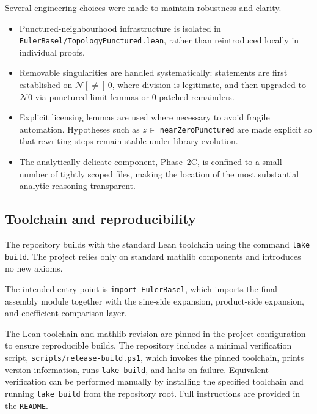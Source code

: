 \documentclass[11pt,a4paper]{article}
\theoremstyle{plain}
\theoremstyle{definition}
\DeclareRobustCommand{\codepath}[1]{\nolinkurl{#1}}
\newcommand{\nhds}{\ensuremath{\mathcal{N}}}
\newcommand{\nhdsPunct}[1]{\ensuremath{\mathcal{N}[{\neq}]\,#1}}
\DeclareRobustCommand{\codepath}[1]{\nolinkurl{#1}}
\begin{document}
Several engineering choices were made to maintain robustness and clarity.

\begin{itemize}[leftmargin=2em]
  \item Punctured-neighbourhood infrastructure is isolated in \codepath{EulerBasel/TopologyPunctured.lean}, rather than reintroduced locally in individual proofs.

  \item Removable singularities are handled systematically: statements are first established on \(\nhdsPunct{0}\), where division is legitimate, and then upgraded to \(\nhds 0\) via punctured-limit lemmas or $0$-patched remainders.

  \item Explicit licensing lemmas are used where necessary to avoid fragile automation. Hypotheses such as \(z \in\) \texttt{nearZeroPunctured} are made explicit so that rewriting steps remain stable under library evolution.

  \item The analytically delicate component, Phase~2C, is confined to a small number of tightly scoped files, making the location of the most substantial analytic reasoning transparent.
\end{itemize}

\subsection{Toolchain and reproducibility}

The repository builds with the standard Lean toolchain using the command
\texttt{lake build}. The project relies only on standard mathlib components and introduces no new axioms.

The intended entry point is
\texttt{import EulerBasel},
which imports the final assembly module together with the sine-side expansion, product-side expansion, and coefficient comparison layer.

The Lean toolchain and mathlib revision are pinned in the project configuration to ensure reproducible builds. The repository includes a minimal verification script,
\codepath{scripts/release-build.ps1},
which invokes the pinned toolchain, prints version information, runs
\texttt{lake build}, and halts on failure. Equivalent verification can be performed manually by installing the specified toolchain and running
\texttt{lake build} from the repository root. Full instructions are provided in the \texttt{README}.
\end{document}
